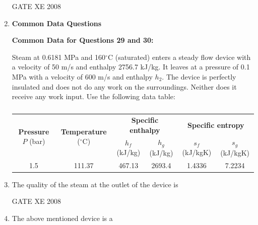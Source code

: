 \documentclass[12pt]{article}
\begin{document}
\begin{enumerate}
GATE XE 2008  


\item[] \textbf{\Large Common Data Questions}

\textbf{Common Data for Questions 29 and 30:}  

Steam at 0.6181 MPa and 160$^\circ$C (saturated) enters a steady flow device with a velocity of 50 m/s and enthalpy 2756.7 kJ/kg. It leaves at a pressure of 0.1 MPa with a velocity of 600 m/s and enthalpy $h_2$. The device is perfectly insulated and does not do any work on the surroundings. Neither does it receive any work input. Use the following data table:  

\begin{table}[H]     \centering     \caption{}     \label{}     \begin{tabular}{|c|c|c|c|c|c|}
\hline
\multirow{2}{*}{\textbf{Pressure} $P$ (bar)} & 
\multirow{2}{*}{\textbf{Temperature} ($^{\circ}$C)} & 
\multicolumn{2}{c|}{\textbf{Specific enthalpy}} & 
\multicolumn{2}{c|}{\textbf{Specific entropy}} \\ \cline{3-6}
 & & $h_f$ (kJ/kg) & $h_g$ (kJ/kg) & $s_f$ (kJ/kgK) & $s_g$ (kJ/kgK) \\ \hline
1.5 & 111.37 & 467.13 & 2693.4 & 1.4336 & 7.2234 \\ \hline
\end{tabular} \end{table}


\item The quality of the steam at the outlet of the device is  
\begin{enumerate}
\end{enumerate}

 GATE XE 2008  

\item The above mentioned device is a  

\begin{enumerate}
\end{enumerate}


\end{enumerate}
\end{document}
